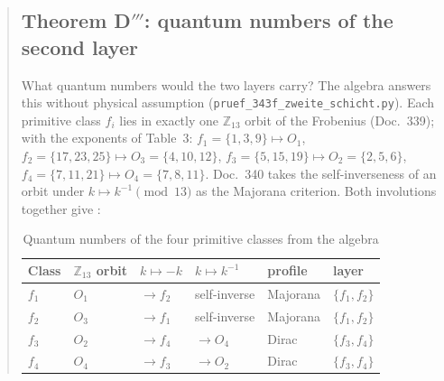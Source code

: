 \begin{abstract}
\subsection{Theorem D$'''$: quantum numbers of the second layer}

What quantum numbers would the two layers carry? The algebra answers
this without physical assumption (\texttt{pruef\_343f\_zweite\_schicht.py}).
Each primitive class $f_i$ lies in exactly one $\mathbb{Z}_{13}$ orbit of the
Frobenius (Doc.~339); with the exponents of Table~3: $f_1=\{1,3,9\} \mapsto O_1$,
$f_2=\{17,23,25\} \mapsto O_3=\{4,10,12\}$, $f_3=\{5,15,19\} \mapsto O_2=\{2,5,6\}$,
$f_4=\{7,11,21\} \mapsto O_4=\{7,8,11\}$. Doc.~340 takes the
self-inverseness of an orbit under $k \mapsto k^{-1} \pmod{13}$ as the Majorana
criterion. Both involutions together give \BM:

\begin{table}[H]
\centering
\caption{Quantum numbers of the four primitive classes from the algebra}
\begin{tabular}{llllll}
\toprule
Class & $\mathbb{Z}_{13}$ orbit & $k\mapsto -k$ & $k\mapsto k^{-1}$ & profile & layer \\
\midrule
$f_1$ & $O_1$ & $\to f_2$ & self-inverse & Majorana & $\{f_1,f_2\}$ \\
$f_2$ & $O_3$ & $\to f_1$ & self-inverse & Majorana & $\{f_1,f_2\}$ \\
$f_3$ & $O_2$ & $\to f_4$ & $\to O_4$ & Dirac & $\{f_3,f_4\}$ \\
$f_4$ & $O_4$ & $\to f_3$ & $\to O_2$ & Dirac & $\{f_3,f_4\}$ \\
\bottomrule
\end{tabular}
\end{table}


\end{abstract}

